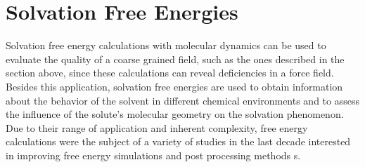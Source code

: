 \section{Solvation Free Energies}

Solvation free energy calculations with molecular dynamics can be used to evaluate the quality of a coarse grained field, such as the ones described in the section above, since these calculations can reveal deficiencies in a force field. Besides this application, solvation free energies are used to obtain information about the behavior of the solvent in different chemical environments and to assess the influence of the solute's molecular geometry on the solvation phenomenon. Due to their range of application and inherent complexity, free energy calculations were the subject of a variety of studies in the last decade interested in improving free energy simulations and post processing methods \cite{mbar,bareva,dexp,gdel}s.

